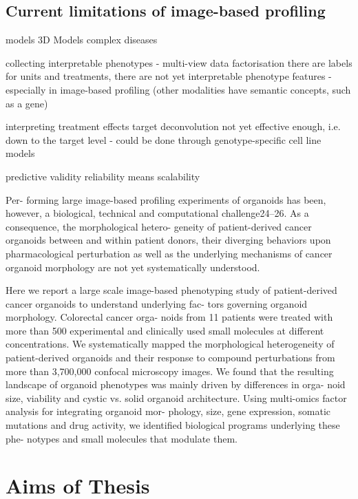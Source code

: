 \begin{flushleft}
\subsection{Current limitations of image-based profiling}

models 3D Models
complex diseases 

collecting interpretable phenotypes - multi-view data 
factorisation
there are labels for units and treatments, there are not yet interpretable phenotype features - especially in image-based profiling (other modalities have semantic concepts, such as a gene)


interpreting treatment effects
target deconvolution not yet effective enough, i.e. down to the target level - could be done through genotype-specific cell line models



predictive validity
reliability means scalability




Per- forming large image-based profiling experiments of organoids has been, however, a biological, technical and computational challenge24–26. As a consequence, the morphological hetero- geneity of patient-derived cancer organoids between and within patient donors, their diverging behaviors upon pharmacological perturbation as well as the underlying mechanisms of cancer organoid morphology are not yet systematically understood.


Here we report a large scale image-based phenotyping study of patient-derived cancer organoids to understand underlying fac- tors governing organoid morphology. Colorectal cancer orga- noids from 11 patients were treated with more than 500 experimental and clinically used small molecules at different concentrations. We systematically mapped the morphological heterogeneity of patient-derived organoids and their response to compound perturbations from more than 3,700,000 confocal microscopy images. We found that the resulting landscape of organoid phenotypes was mainly driven by differences in orga- noid size, viability and cystic vs. solid organoid architecture. Using multi-omics factor analysis for integrating organoid mor- phology, size, gene expression, somatic mutations and drug activity, we identified biological programs underlying these phe- notypes and small molecules that modulate them.

\section{Aims of Thesis}

\end{flushleft}
